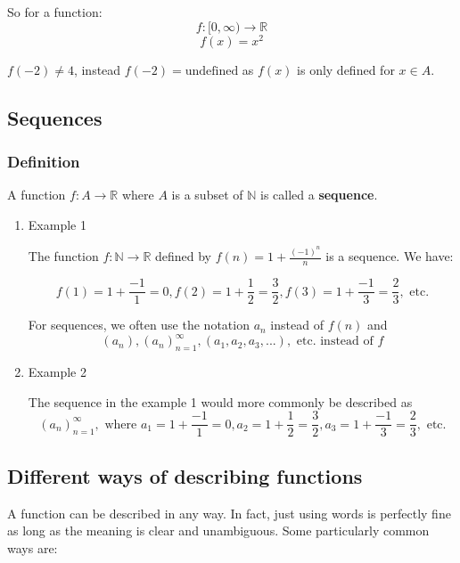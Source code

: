 \documentclass[11pt]{article}
\begin{document}
So for a function:
\[f : [0, \infty) \rightarrow \mathbb{R}\]
\[f(x) = x^2\]

\(f(-2) \neq 4\), instead \(f(-2) = \text{undefined}\) as \(f(x)\) is only defined for \(x \in A\).

\newpage

\subsection{Sequences}
\label{sec:org93762f2}

\subsubsection{Definition}
\label{sec:orgb0d10b6}
A function \(f : A \rightarrow \mathbb{R}\) where \(A\) is a subset of \(\mathbb{N}\) is called a \textbf{sequence}.

\begin{enumerate}
\item Example 1
\label{sec:org34e95a0}

The function \(f: \mathbb{N} \rightarrow \mathbb{R}\) defined by \(f(n) = 1 + \frac{(-1)^n}{n}\) is a sequence. We have:

\[f(1) = 1 + \frac{-1}{1} = 0, f(2) = 1 + \frac{1}{2} = \frac{3}{2}, f(3) = 1 + \frac{-1}{3} = \frac{2}{3}, \text{ etc.}\]

For sequences, we often use the notation \(a_n\) instead of \(f(n)\) and
\[(a_n), (a_n)_{n=1}^{\infty}, (a_1, a_2, a_3, ...), \text{ etc. instead of } f\]

\item Example 2
\label{sec:orgaf350ca}

The sequence in the example 1 would more commonly be described as
\[(a_n)_{n=1}^{\infty}, \text{ where } a_1 = 1 + \frac{-1}{1} = 0, a_2 = 1 + \frac{1}{2} = \frac{3}{2}, a_3 = 1 + \frac{-1}{3} = \frac{2}{3}, \text{ etc.}\]

\newpage
\end{enumerate}

\subsection{Different ways of describing functions}
\label{sec:org304379b}
A function can be described in any way. In fact, just using words is perfectly fine as long as the meaning is clear and unambiguous. Some particularly common ways are:
\\[0pt]
\end{document}
